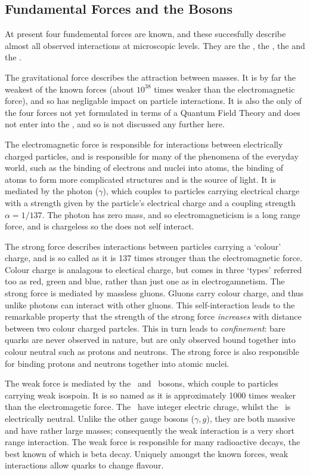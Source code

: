 \subsection{Fundamental Forces and the Bosons}

At present four fundemental forces are known, and these succesfully describe
almost all observed interactions at microscopic levels. They are the
, the , the  
and the . 

The gravitational force describes the attraction
between masses. It is by far the
weakest of the known forces (about $10^{38}$ times weaker than the electromagnetic
force), and so has negligable impact on particle interactions. It is
also the only of the four forces not yet formulated in terms of a Quantum Field
Theory and does not enter into the \sm, and so is not discussed any further here.

The electromagnetic force is responsible for interactions between electrically
charged particles, and is responsible for many of the phenomena of the everyday
world, such as the binding of electrons and nuclei into atoms, the binding of
atoms to form more complicated structures and is the source of light. 
It is mediated by the photon ($\gamma$), which couples to
particles carrying electrical charge with a strength given by the particle's
electrical charge and a coupling strength $\alpha=1/137$. The photon has zero
mass, and so electromagneticism is a long range force, and is chargeless so
the does not self interact.

The strong force describes interactions between particles carrying a `colour'
charge, and is so called as it is 137 times stronger than the electromagnetic
force. Colour charge is analagous to electical charge, but comes in three
`types' referred too as red, green and blue, rather than just one as in
electrogamnetism. The strong force is mediated by massless gluons. Gluons carry
colour charge, and thus unlike photons can interact with other gluons. This
self-interaction leads to the remarkable property that the strength of the strong force {\it
increases} with distance between two colour charged partcles. This in turn leads to {\it
confinement}: bare quarks are never observed in nature, but are only observed
bound together into colour neutral  such as protons and neutrons. 
The strong force is also responsible for binding protons and neutrons together
into atomic nuclei.

The weak force is mediated by the \Wpm\ and \Z\ bosons, which couple to particles
carrying weak isospoin. It is so named as it is approximately 1000 times weaker
than the electromagetic force. The \Wpm\ have integer electric
chrage, whilst the \Z\ is electrically neutral. Unlike the other gauge bosons
($\gamma,g$), they are both massive and have rather large masses; consequently the weak
interaction is a very short range interaction. The weak force is responsible for
many radioactive decays, the best known of which is beta decay. Uniquely amongst
the known forces, weak interactions allow quarks to change flavour.

